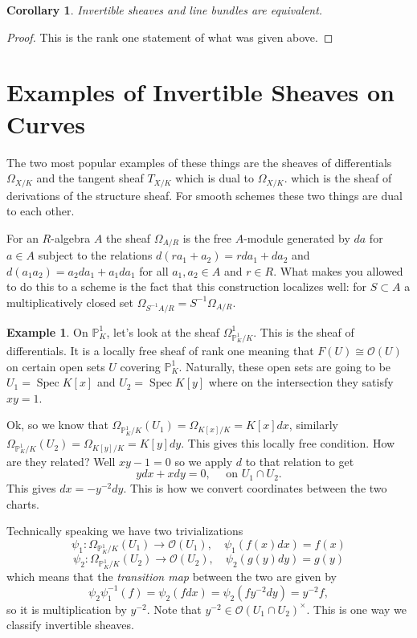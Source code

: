 \documentclass[12pt]{article}
\numberwithin{equation}{section}
\newtheorem{corollary}[theorem]{Corollary}
\theoremstyle{definition}
\newtheorem{example}[theorem]{Example}
\theoremstyle{remark}
\newcommand{\Ocal}{\mathcal{O}}
\newcommand{\PP}{\mathbb{P}}
\newcommand{\Spec}{\operatorname{Spec}}
\begin{document}
\begin{corollary}
	Invertible sheaves and line bundles are equivalent.
\end{corollary}
\begin{proof}
	This is the rank one statement of what was given above.
\end{proof}

\section{Examples of Invertible Sheaves on Curves}
The two most popular examples of these things are the sheaves of differentials $\Omega_{X/K}$ and the tangent sheaf $T_{X/K}$ which is dual to $\Omega_{X/K}$. which is the sheaf of derivations of the structure sheaf. 
For smooth schemes these two things are dual to each other.

For an $R$-algebra $A$ the sheaf $\Omega_{A/R}$ is the free $A$-module generated by $da$ for $a \in A$ subject to the relations $d(ra_1+a_2)=rda_1+da_2$ and $d(a_1a_2) = a_2da_1 + a_1 da_1$ for all $a_1,a_2 \in A$ and $r\in R$. 
What makes you allowed to do this to a scheme is the fact that this construction localizes well: for $S\subset A$ a multiplicatively closed set $\Omega_{S^{-1}A/R} = S^{-1} \Omega_{A/R}$.

\begin{example}\label{example:omega-on-p1}
	On $\PP^1_K$, let's look at the sheaf $\Omega^1_{\PP^1_K/K}$.
	This is the sheaf of differentials.
	It is a locally free sheaf of rank one meaning that $F(U) \cong \Ocal(U)$ on certain open sets $U$ covering $\PP^1_K$.
	Naturally, these open sets are going to be $U_1 = \Spec K[x]$ and $U_2 = \Spec K[y]$ where on the intersection they satisfy $xy=1$.
	
	Ok, so we know that $\Omega_{\PP^1_K/K}(U_1) = \Omega_{K[x]/K}=K[x]dx$, similarly $\Omega_{\PP^1_K/K}(U_2) = \Omega_{K[y]/K} = K[y]dy$.
	This gives this locally free condition.
	How are they related?
	Well $xy-1=0$ so we apply $d$ to that relation to get 
	 $$ ydx + x dy =0, \quad \mbox{ on } U_1 \cap U_2. $$
	 This gives $dx = -y^{-2} dy$.
	 This is how we convert coordinates between the two charts.
	 
	 Technically speaking we have two trivializations 
	  $$\psi_1: \Omega_{\PP^1_K/K}(U_1) \to \Ocal(U_1), \quad \psi_1(f(x) dx)=f(x)$$
	  $$\psi_2:\Omega_{\PP^1_K/K}(U_2) \to \Ocal(U_2), \quad \psi_2(g(y) dy) =g(y)$$
	 which means that the \emph{transition map} between the two are given by 
	  $$ \psi_2\psi_1^{-1}(f ) = \psi_2( f dx ) = \psi_2( f y^{-2} dy ) = y^{-2} f ,$$
	  so it is multiplication by $y^{-2}$.
	  Note that $y^{-2} \in \Ocal(U_1\cap U_2)^{\times}$. 
	  This is one way we classify invertible sheaves.
\end{example}
\end{document}
